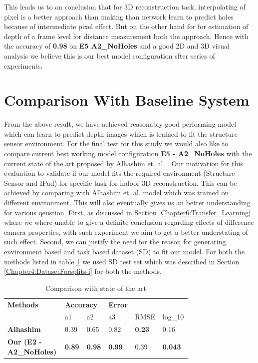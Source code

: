This leads us to an conclusion that for 3D reconstruction task, interpolating of pixel is a better approach than making than network learn to predict holes because of intermediate pixel effect. But on the other hand for for estimation of depth of a frame level for distance measurement both the approach. Hence with the accuracy of \textbf{0.98} on \textbf{E5 A2\_NoHoles} and a good 2D and 3D visual analysis we believe this is our best model configuration sfter series of experiments.




\newpage
\section{Comparison With Baseline System}
 \label{Chapter6:ComapreS-F-A}


From the above result, we have achieved reasonably good performing model which can learn to predict depth images which is trained to fit the structure sensor environment. For the final test for this study we would also like to compare current best working model configuration \textbf{E5 - A2\_NoHoles} with the current state of the art proposed by Alhashim et. al. \cite{Alhashim2018}. Our motivation for this evaluation to validate if our model fits the required environment (Structure Sensor and IPad) for specific task for indoor 3D reconstruction. This can be achieved by comparing with Alhashim et. al. model which was trained on different environment. This will also eventually gives us an better understanding for various qeustion. First, as discussed in Section \ref{Chapter6:Transfer_Learning} where we where unable to give a definite conclusion regarding effects of difference camera properties, with such experiment we aim to get a better understating of such effect. Second, we can justify the need for the reason for generating environment based and task based dataset (SD) to fit our model. For both the methods listed in table \ref{table:Results_SFA} we used SD test set which was described in Section \ref{Chapter4:DatasetForsplits-i} for both the methods. 

\begin{table}[h]
\centering
\begin{tabular}{p{0.3\linewidth}p{0.1\linewidth}p{0.1\linewidth}p{0.08\linewidth}p{0.08\linewidth}p{0.07\linewidth}} \hline
\textbf{Methods} & \multicolumn{2}{l}{\textbf{Accuracy}} & {\textbf{Error}} \\ \cline{2-6} 
    &  a1& a2  & a3    & RMSE & log\_10   \\ \hline \hline
\textbf{Alhashim} \cite{Alhashim2018}    &  0.39 & 0.65   &  0.82  & \textbf{0.23}   &   0.16  \\ \hline

\textbf{Our (E2 - A2\_NoHoles)}     &   \textbf{0.89} & \textbf{0.98} & \textbf{0.99}   & 0.39  & \textbf{0.043}  \\ \hline

\end{tabular}
\caption{Comparison with state of the art}
\label{table:Results_SFA}
\end{table} 


